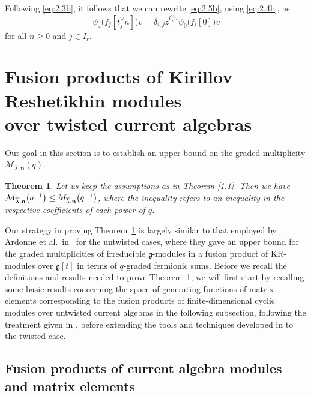 \documentclass[pdftex]{sigma}
\numberwithin{equation}{section}
\newtheorem{Theorem}{Theorem}[section]
\begin{document}
Following \eqref{eq:2.3b}, it follows that we can rewrite \eqref{eq:2.5b}, using \eqref{eq:2.4b}, as
\begin{equation}\label{eq:2.6}
\psi_z\bigl(\overline{f}_j[t_j^{\vee}n]\bigr)v =\delta_{i,j}z^{t_j^{\vee}n}\psi_0\bigl(\overline{f}_i[0]\bigr)v
\end{equation}
for all $n\geq0$ and $j\in I_r$.

\section[Fusion products of Kirillov--Reshetikhin modules over twisted current algebras]{Fusion products of Kirillov--Reshetikhin modules\\ over twisted current algebras}\label{Section 3}

Our goal in this section is to establish an upper bound on the graded multiplicity $\mathcal{M}_{\overline{ \lambda},\mathbf{n}}(q)$.

\begin{Theorem}\label{3.1}
Let us keep the assumptions as in Theorem {\rm\ref{1.1}}. Then we have
$\smash{
\mathcal{M}_{\overline{\lambda},\mathbf{n}}}\bigl(q^{-1}\bigr)\leq \smash{M_{\overline{\lambda},\mathbf{n}}}\bigl(q^{-1}\bigr)$,
where the inequality refers to an inequality in the respective coefficients of each power of $q$.
\end{Theorem}

Our strategy in proving Theorem~\ref{3.1} is largely similar to that employed by Ardonne et al.\ in~\cite{AK07,AKS06} for the untwisted cases, where they gave an upper bound for the graded multiplicities of irreducible $\mathfrak{g}$-modules in a fusion product of KR-modules over $\mathfrak{g}[t]$ in terms of $q$-graded fermionic sums. Before we recall the definitions and results needed to prove Theorem~\ref{3.1}, we will first start by recalling some basic results concerning the space of generating functions of matrix elements corresponding to the fusion products of finite-dimensional cyclic modules over untwisted current algebras in the following subsection, following the treatment given in \cite[Section 3.2]{AK07}, before extending the tools and techniques developed in \cite{AK07,AKS06} to the twisted case.

\subsection{Fusion products of current algebra modules and matrix elements}\label{Section 3.1}
\end{document}
